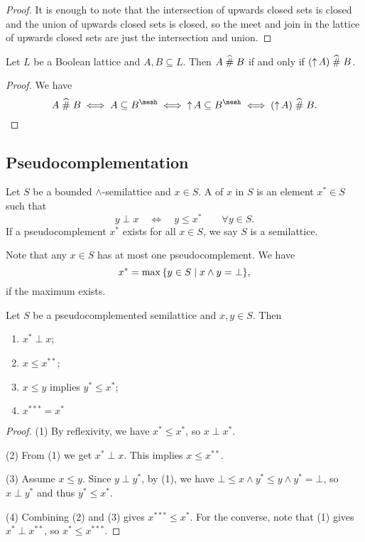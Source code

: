 \begin{proof}
It is enough to note that the intersection of upwards closed sets is closed and the union of upwards closed sets is closed, so the meet and join in the lattice of upwards closed sets are just the intersection and union.
\end{proof}
\begin{corollary} \label{ameshUpwardClosure}
Let $L$ be a Boolean lattice and $A, B \subseteq L$. Then $A \mathrel{\widehat{\#}} B$ \textup{if and only if} $(\operatorname{\uparrow} A) \mathrel{\widehat{\#}} B$.
\end{corollary}
\begin{proof}
We have
\[ A\amesh B \iff A\subseteq B^\mesh \iff \upset A\subseteq B^\mesh \iff (\upset A)\amesh B. \]
\end{proof}

\subsection{Pseudocomplementation}
\begin{definition}
Let $S$ be a bounded $\wedge$-semilattice and $x\in S$. A  of $x$ in $S$ is an element $x^*\in S$ such that
\[ y \perp x \quad\iff\quad y\leq x^* \qquad \forall y\in S. \]
If a pseudocomplement $x^*$ exists for all $x\in S$, we say $S$ is a  semilattice.
\end{definition}
Note that any $x\in S$ has at most one pseudocomplement.
We have
\[ x^* = \max\setbuilder{y\in S}{x\wedge y = \bot}, \]
if the maximum exists.

\begin{lemma}
Let $S$ be a pseudocomplemented semilattice and $x,y\in S$. Then
\begin{enumerate}
\item $x^* \perp x$;
\item $x \leq x^{**}$;
\item $x \leq y$ implies $y^* \leq x^*$;
\item $x^{***} = x^*$
\end{enumerate}
\end{lemma}
\begin{proof}
(1) By reflexivity, we have $x^*\leq x^*$, so $x\perp x^*$.

(2) From (1) we get $x^*\perp x$. This implies $x\leq x^{**}$.

(3)  Assume $x\leq y$. Since $y\perp y^*$, by (1), we have $\bot \leq x\wedge y^* \leq y\wedge y^* = \bot$, so $x\perp y^*$ and thus $y^* \leq x^*$.

(4) Combining (2) and (3) gives $x^{***} \leq x^*$. For the converse, note that (1) gives $x^*\perp x^{**}$, so $x^* \leq x^{***}$.
\end{proof}

